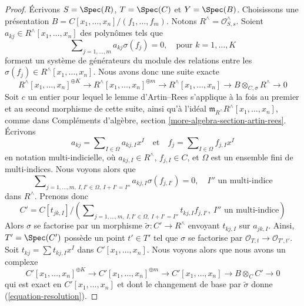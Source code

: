 \begin{proof}
\medskip\noindent
Écrivons $S = \Spec(R)$, $T = \Spec(C)$ et $Y = \Spec(B)$.
Choisissons une présentation $B = C[x_1, \ldots, x_n]/(f_1, \ldots, f_m)$.
Notons $R^\wedge = \mathcal{O}_{S, s}^\wedge$.
Soient $a_{kj} \in R^\wedge[x_1, \ldots, x_n]$ des polynômes
tels que
$$
\sum\nolimits_{j = 1, \ldots, m} a_{kj}\sigma(f_j) = 0,\quad
\text{pour }k = 1, \ldots, K
$$
forment un système de générateurs du module des relations entre
les $\sigma(f_j) \in R^\wedge[x_1, \ldots, x_n]$.
Nous avons donc une suite exacte
\begin{equation}
\label{equation-resolution}
R^\wedge[x_1, \ldots, x_n]^{\oplus K} \to
R^\wedge[x_1, \ldots, x_n]^{\oplus m} \to
R^\wedge[x_1, \ldots, x_n] \to B \otimes_{C, \sigma} R^\wedge \to 0
\end{equation}
Soit $c$ un entier pour lequel le lemme d'Artin--Rees s'applique
à la fois au premier et au second morphisme de cette suite, ainsi qu'à l'idéal
$\mathfrak m_{R^\wedge}R^\wedge[x_1, \ldots, x_n]$, comme dans
Compléments d'algèbre, section \ref{more-algebra-section-artin-rees}.
Écrivons
$$
a_{kj} = \sum\nolimits_{I \in \Omega} a_{kj, I} x^I
\quad\text{et}\quad
f_j = \sum\nolimits_{I \in \Omega} f_{j, I} x^I
$$
en notation multi-indicielle, où $a_{kj, I} \in R^\wedge$, $f_{j, I} \in C$,
et $\Omega$ est un ensemble fini de multi-indices. Nous voyons alors que
$$
\sum\nolimits_{j = 1, \ldots, m,\ I, I' \in \Omega,\ I + I' = I''}
a_{kj, I} \sigma(f_{j, I'}) = 0,\quad
I''\text{ un multi-indice}
$$
dans $R^\wedge$. Prenons donc
$$
C' = C[t_{jk, I}]/
\left(
\sum\nolimits_{j = 1, \ldots, m,\ I, I' \in \Omega,\ I + I' = I''}
t_{kj, I} f_{j, I'},\ I''\text{ un multi-indice}\right)
$$
Alors $\sigma$ se factorise par un morphisme $\tilde\sigma : C' \to R^\wedge$
envoyant $t_{kj, I}$ sur $a_{jk, I}$.
Ainsi, $T' = \Spec(C')$ possède un point $t' \in T'$ tel que
$\sigma$ se factorise par $\mathcal{O}_{T, t} \to \mathcal{O}_{T', t'}$.
Soit $t_{kj} = \sum t_{kj, I} x^I$ dans $C'[x_1, \ldots, x_n]$.
Nous voyons alors que nous avons un complexe
\begin{equation}
\label{equation-resolution-new}
C'[x_1, \ldots, x_n]^{\oplus K} \to
C'[x_1, \ldots, x_n]^{\oplus m} \to
C'[x_1, \ldots, x_n] \to B \otimes_C C' \to 0
\end{equation}
qui est exact en $C'[x_1, \ldots, x_n]$ et dont le changement de base
par $\tilde\sigma$ donne (\ref{equation-resolution}).


\end{proof}
